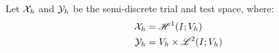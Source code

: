 \begin{frame}
\begin{center}
        \begin{minipage}{0.75\textwidth}
            \begin{definition}
                Let $\mathcal{X}_{h}$ and $\mathcal{Y}_{h}$ be the semi-discrete trial and test space, where:
                \begin{align*}
                    \mathcal{X}_{h} &= \mathscr{H}^{1}(I; V_h) \\
                    \mathcal{Y}_{h} &= V_h \times \mathscr{L}^{2}(I; V_h)
                \end{align*}
            \end{definition}
        \end{minipage}
    \end{center}
    \vspace*{\fill}
    
\end{frame}

